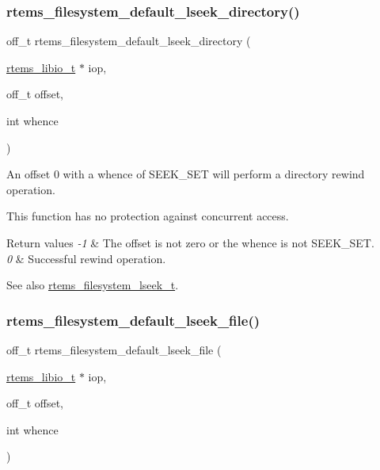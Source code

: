 \subsubsection{\texorpdfstring{rtems\_filesystem\_default\_lseek\_directory()}{rtems\_filesystem\_default\_lseek\_directory()}}
{\footnotesize\ttfamily off\+\_\+t rtems\+\_\+filesystem\+\_\+default\+\_\+lseek\+\_\+directory (\begin{DoxyParamCaption}\item[{\mbox{\hyperlink{structrtems__libio__tt}{rtems\+\_\+libio\+\_\+t}} $\ast$}]{iop,  }\item[{off\+\_\+t}]{offset,  }\item[{int}]{whence }\end{DoxyParamCaption})}



An offset 0 with a whence of S\+E\+E\+K\+\_\+\+S\+ET will perform a directory rewind operation. 

This function has no protection against concurrent access.


\begin{DoxyRetVals}{Return values}
{\em -\/1} & The offset is not zero or the whence is not S\+E\+E\+K\+\_\+\+S\+ET. \\
\hline
{\em 0} & Successful rewind operation.\\
\hline
\end{DoxyRetVals}
\begin{DoxySeeAlso}{See also}
\mbox{\hyperlink{group__LibIOFSHandler_gab3752ab0473efced7afee0d60c0e2c58}{rtems\+\_\+filesystem\+\_\+lseek\+\_\+t}}. 
\end{DoxySeeAlso}
\mbox{\label{group__LibIOFSHandler_ga84f8b0895bbd61dd0f8d5a62864dcc2c}} 
\subsubsection{\texorpdfstring{rtems\_filesystem\_default\_lseek\_file()}{rtems\_filesystem\_default\_lseek\_file()}}
{\footnotesize\ttfamily off\+\_\+t rtems\+\_\+filesystem\+\_\+default\+\_\+lseek\+\_\+file (\begin{DoxyParamCaption}\item[{\mbox{\hyperlink{structrtems__libio__tt}{rtems\+\_\+libio\+\_\+t}} $\ast$}]{iop,  }\item[{off\+\_\+t}]{offset,  }\item[{int}]{whence }\end{DoxyParamCaption})}



